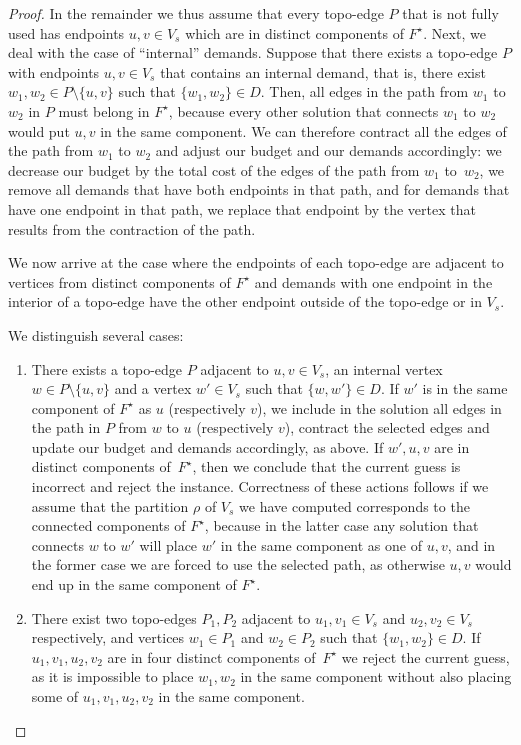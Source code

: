 \documentclass[a4paper]{article}
\theoremstyle{plain}
\begin{document}
\begin{proof}
In the remainder we thus assume that every topo-edge $P$ that is not fully used
has endpoints $u,v\in V_s$ which are in distinct components of $F^\star$. Next, we
deal with the case of ``internal'' demands. Suppose that there exists a
topo-edge $P$ with endpoints $u,v\in V_s$ that contains an internal demand,
that is, there exist $w_1,w_2\in P\setminus\{u,v\}$ such that $\{w_1,w_2\}\in
D$.  Then, all edges in the path from $w_1$ to $w_2$ in $P$ must belong in
$F^\star$, because every other solution that connects $w_1$ to $w_2$ would put
$u,v$ in the same component. We can therefore contract all the edges of the
path from $w_1$ to $w_2$ and adjust our budget and our demands
accordingly: we decrease our budget by the total cost of the edges of
the path from $w_1$ to~$w_2$, we remove all demands that have both endpoints in
that path, and for demands that have one endpoint in that path, we replace that
endpoint by the vertex that results from the contraction of the path.

We now arrive at the case where the endpoints of each topo-edge are adjacent to
vertices from distinct components of $F^\star$ and demands with one endpoint in the
interior of a topo-edge have the other endpoint outside of the topo-edge or in
$V_s$.

We distinguish several cases:

\begin{enumerate}

\item There exists a topo-edge $P$ adjacent to $u,v\in V_s$, an internal vertex
$w\in P\setminus\{u,v\}$ and a vertex $w'\in V_s$ such that $\{w,w'\}\in D$. If
$w'$ is in the same component of $F^\star$ as $u$ (respectively $v$), we include in
the solution all edges in the path in $P$ from $w$ to $u$ (respectively $v$),
contract the selected edges and update our budget and demands accordingly, as above. If
$w',u,v$ are in distinct components of~$F^\star$, then we conclude that the current
guess is incorrect and reject the instance. Correctness of these actions
follows if we assume that the partition $\rho$ of $V_s$ we have computed
corresponds to the connected components of $F^\star$, because in the latter case
any solution that connects $w$ to $w'$ will place $w'$ in the same component as
one of $u,v$, and in the former case we are forced to use the selected path, as
otherwise $u,v$ would end up in the same component of $F^\star$.

\item There exist two topo-edges $P_1,P_2$ adjacent to $u_1,v_1\in V_s$ and
$u_2,v_2\in V_s$ respectively, and vertices $w_1\in P_1$ and $w_2\in P_2$ such
that $\{w_1,w_2\}\in D$. If $u_1,v_1,u_2,v_2$ are in four distinct components
of~$F^\star$ we reject the current guess, as it is impossible to place $w_1,w_2$ in
the same component without also placing some of $u_1,v_1,u_2,v_2$ in the same
component.


\end{enumerate}
\end{proof}
\end{document}
